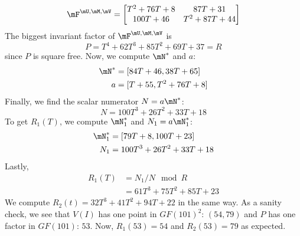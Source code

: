 \documentclass[12pt]{article}
\begin{document}
$$ \mF^{\mU,\mM,\mV} =
\begin{bmatrix}
T^2 + 76T + 8&       87T + 31\\
    100T + 46& T^2 + 87T + 44
\end{bmatrix}
$$
The biggest invariant factor of $\mF^{\mU,\mM,\mV}$ is 
$$P = T^4 + 62T^3 + 85T^2 + 69T + 37 = R$$
since $P$ is square free. 
Now, we compute $\mN^*$ and $a$:
\begin{align*}
\mN^* &=[84T + 46, 38T + 65]\\
a &= [T + 55, T^2 + 76T + 8]
\end{align*}
Finally, we find the scalar numerator $N = a\mN^*$:
$$ N = 100T^3 + 26T^2 + 33T + 18$$
To get $R_1(T)$, we compute $\mN_1^*$ and $N_1=a\mN_1^*$:
\begin{align*}
\mN_1^* &= [79T + 8, 100T + 23]\\
N_1 &= 100T^3 + 26T^2 + 33T + 18
\end{align*}
Lastly,
\begin{align*}
R_1(T) &= N_1 / N \mod R \\
       &= 61T^3 + 75T^2 + 85T + 23
\end{align*}
We compute $R_2(t)= 32T^3 + 41T^2 + 94T + 22$ in the same way. 
As a sanity check,
we see that $V(I)$ has one point in $GF(101)^2$:
$(54,79)$ and $P$ has one factor in $GF(101)$: $53$. Now,
$R_1(53) = 54$ and $R_2(53) = 79$ as expected.

\newpage
\end{document}
